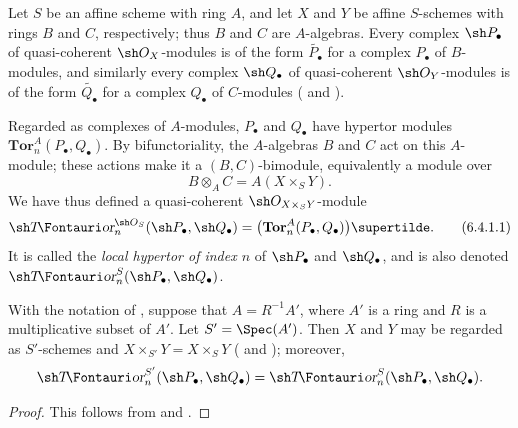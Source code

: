 \begin{env}[6.4.1]
\label{III.6.4.1}
Let $S$ be an affine scheme with ring $A$, and let $X$ and $Y$ be
affine $S$-schemes with rings $B$ and $C$, respectively; thus $B$
and $C$ are $A$-algebras.  Every complex $\sh P_\bullet$ of
quasi-coherent $\sh O_X$-modules is of the form
$\widetilde{P_\bullet}$ for a complex $P_\bullet$ of $B$-modules,
and similarly every complex $\sh Q_\bullet$ of quasi-coherent
$\sh O_Y$-modules is of the form $\widetilde{Q_\bullet}$ for a
complex $Q_\bullet$ of $C$-modules
( and ).

Regarded as complexes of $A$-modules, $P_\bullet$ and $Q_\bullet$
have hypertor modules
$\mathbf{Tor}_n^A(P_\bullet,Q_\bullet)$.  By bifunctoriality, the
$A$-algebras $B$ and $C$ act on this $A$-module; these actions make
it a $(B,C)$-bimodule, equivalently a module over
\[
  B\otimes_AC=A(X\times_SY).
\]
We have thus defined a quasi-coherent
$\sh O_{X\times_SY}$-module
\[
  \shTor_n^{\sh O_S}(\sh P_\bullet,\sh Q_\bullet)
  =
  \bigl(\mathbf{Tor}_n^A(P_\bullet,Q_\bullet)\bigr)\supertilde.
  \tag{6.4.1.1}\label{III.6.4.1.1}
\]
It is called the \emph{local hypertor of index $n$} of
$\sh P_\bullet$ and $\sh Q_\bullet$, and is also denoted
$\shTor_n^S(\sh P_\bullet,\sh Q_\bullet)$.
\end{env}

\begin{lemma}[6.4.2]
\label{III.6.4.2}
With the notation of , suppose that
$A=R^{-1}A'$, where $A'$ is a ring and $R$ is a multiplicative
subset of $A'$.  Let $S'=\Spec(A')$.  Then $X$ and $Y$ may be
regarded as $S'$-schemes and
$X\times_{S'}Y=X\times_SY$
( and ); moreover,
\[
  \shTor_n^{S'}(\sh P_\bullet,\sh Q_\bullet)
  =
  \shTor_n^S(\sh P_\bullet,\sh Q_\bullet).
\]
\end{lemma}

\begin{proof}
This follows from  and .
\end{proof}

